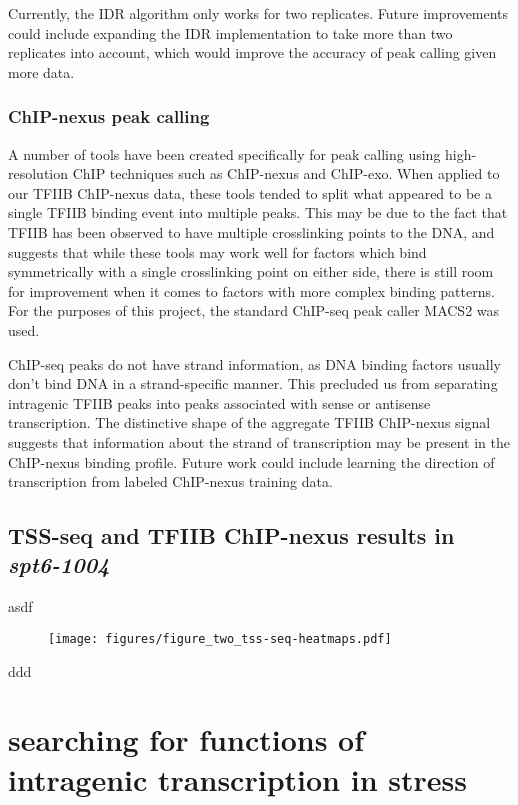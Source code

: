 \documentclass[11pt, a4paper]{article}
\begin{document}
Currently, the IDR algorithm only works for two replicates. Future improvements could include expanding the IDR implementation to take more than two replicates into account, which would improve the accuracy of peak calling given more data.

\subsubsection{ChIP-nexus peak calling}

A number of tools have been created specifically for peak calling using high-resolution ChIP techniques such as ChIP-nexus and ChIP-exo. When applied to our TFIIB ChIP-nexus data, these tools tended to split what appeared to be a single TFIIB binding event into multiple peaks. This may be due to the fact that TFIIB has been observed to have multiple crosslinking points to the DNA, and suggests that while these tools may work well for factors which bind symmetrically with a single crosslinking point on either side, there is still room for improvement when it comes to factors with more complex binding patterns. For the purposes of this project, the standard ChIP-seq peak caller MACS2 was used.

ChIP-seq peaks do not have strand information, as DNA binding factors usually don't bind DNA in a strand-specific manner. This precluded us from separating intragenic TFIIB peaks into peaks associated with sense or antisense transcription. The distinctive shape of the aggregate TFIIB ChIP-nexus signal suggests that information about the strand of transcription may be present in the ChIP-nexus binding profile. Future work could include learning the direction of transcription from labeled ChIP-nexus training data.

\subsection{TSS-seq and TFIIB ChIP-nexus results in \textit{spt6-1004}}

asdf

\begin{figure}[h]
\centering
\texttt{[image: figures/figure\_two\_tss-seq-heatmaps.pdf]}
\end{figure}

ddd

\section{searching for functions of intragenic transcription in stress}
\end{document}
